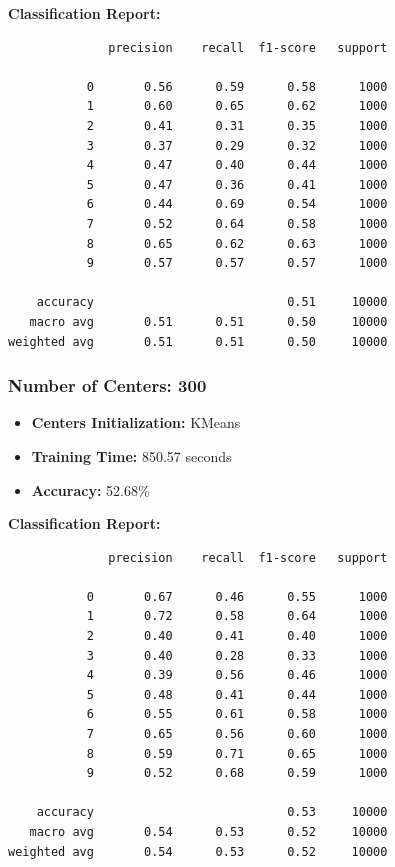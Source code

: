 \documentclass[lettersize,journal]{IEEEtran}
\begin{document}
\textbf{Classification Report:}
\begin{scriptsize}
\begin{verbatim}
              precision    recall  f1-score   support

           0       0.56      0.59      0.58      1000
           1       0.60      0.65      0.62      1000
           2       0.41      0.31      0.35      1000
           3       0.37      0.29      0.32      1000
           4       0.47      0.40      0.44      1000
           5       0.47      0.36      0.41      1000
           6       0.44      0.69      0.54      1000
           7       0.52      0.64      0.58      1000
           8       0.65      0.62      0.63      1000
           9       0.57      0.57      0.57      1000

    accuracy                           0.51     10000
   macro avg       0.51      0.51      0.50     10000
weighted avg       0.51      0.51      0.50     10000
\end{verbatim}
\end{scriptsize}
\subsubsection{\textbf{Number of Centers: 300}}
\begin{itemize}
    \item \textbf{Centers Initialization:} KMeans
    \item \textbf{Training Time:} 850.57 seconds
    \item \textbf{Accuracy:} 52.68\%
\end{itemize}

\textbf{Classification Report:}
\begin{scriptsize}
\begin{verbatim}
              precision    recall  f1-score   support

           0       0.67      0.46      0.55      1000
           1       0.72      0.58      0.64      1000
           2       0.40      0.41      0.40      1000
           3       0.40      0.28      0.33      1000
           4       0.39      0.56      0.46      1000
           5       0.48      0.41      0.44      1000
           6       0.55      0.61      0.58      1000
           7       0.65      0.56      0.60      1000
           8       0.59      0.71      0.65      1000
           9       0.52      0.68      0.59      1000

    accuracy                           0.53     10000
   macro avg       0.54      0.53      0.52     10000
weighted avg       0.54      0.53      0.52     10000
\end{verbatim}
\end{scriptsize}
\end{document}
